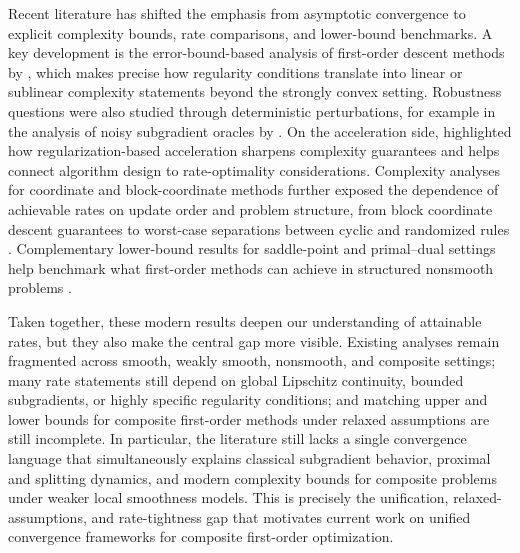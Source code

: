 \documentclass[11pt]{article}
\begin{document}
Recent literature has shifted the emphasis from asymptotic convergence to explicit complexity bounds, rate comparisons, and lower-bound benchmarks. A key development is the error-bound-based analysis of first-order descent methods by \citet{bolte2016errorbounds}, which makes precise how regularity conditions translate into linear or sublinear complexity statements beyond the strongly convex setting. Robustness questions were also studied through deterministic perturbations, for example in the analysis of noisy subgradient oracles by \citet{nedic2009noise}. On the acceleration side, \citet{nesterov2007accelerating} highlighted how regularization-based acceleration sharpens complexity guarantees and helps connect algorithm design to rate-optimality considerations. Complexity analyses for coordinate and block-coordinate methods further exposed the dependence of achievable rates on update order and problem structure, from block coordinate descent guarantees \citep{hong2016iteration} to worst-case separations between cyclic and randomized rules \citep{sun2019worstcase}. Complementary lower-bound results for saddle-point and primal--dual settings help benchmark what first-order methods can achieve in structured nonsmooth problems \citep{ouyang2019lower}.

Taken together, these modern results deepen our understanding of attainable rates, but they also make the central gap more visible. Existing analyses remain fragmented across smooth, weakly smooth, nonsmooth, and composite settings; many rate statements still depend on global Lipschitz continuity, bounded subgradients, or highly specific regularity conditions; and matching upper and lower bounds for composite first-order methods under relaxed assumptions are still incomplete. In particular, the literature still lacks a single convergence language that simultaneously explains classical subgradient behavior, proximal and splitting dynamics, and modern complexity bounds for composite problems under weaker local smoothness models. This is precisely the unification, relaxed-assumptions, and rate-tightness gap that motivates current work on unified convergence frameworks for composite first-order optimization.



\end{document}
